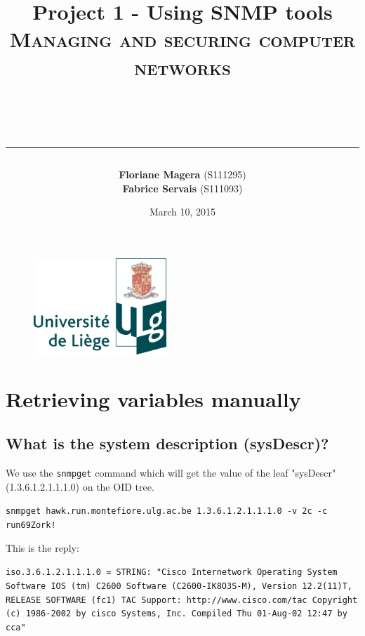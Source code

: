\documentclass[a4paper,titlepage]{article}
\begin{document}
\begin{titlepage}

\begin{figure}
\centering
\includegraphics[width=5cm]{logo-ulg.png}
\end{figure}



\title{
\vspace{0.2cm}
\LARGE{\textbf{Project 1 - Using SNMP tools}} \\ \textsc{Managing and securing computer networks}
\author{\textbf{Floriane Magera} \small{(S111295})\\\textbf{Fabrice Servais} \small{(S111093})}\\
\date{March 10, 2015}
\rule{15cm}{1.5pt}
}

\end{titlepage}

\pagestyle{fancy}

\maketitle

\section{Retrieving variables manually}

	\subsection{What is the system description (sysDescr)?}
We use the \texttt{snmpget} command which will get the value of the leaf "sysDescr" (1.3.6.1.2.1.1.1.0) on the OID tree.
\begin{center}
	\texttt{snmpget hawk.run.montefiore.ulg.ac.be 1.3.6.1.2.1.1.1.0 -v 2c -c run69Zork!}
\end{center}
This is the reply: 
\begin{center}
	\texttt{iso.3.6.1.2.1.1.1.0 = STRING: "Cisco Internetwork Operating System Software 
IOS (tm) C2600 Software (C2600-IK8O3S-M), Version 12.2(11)T,  RELEASE SOFTWARE (fc1)
TAC Support: http://www.cisco.com/tac
Copyright (c) 1986-2002 by cisco Systems, Inc.
Compiled Thu 01-Aug-02 12:47 by cca"}
\end{center}
\end{document}
